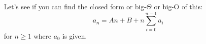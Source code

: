   Let's see if you can find the closed form or big-$\Theta$ or big-O of this:
  \[
  a_n = An + B + n \sum_{i=0}^{n-1} a_i
  \]
  for $n \geq 1$ where $a_0$ is given.
